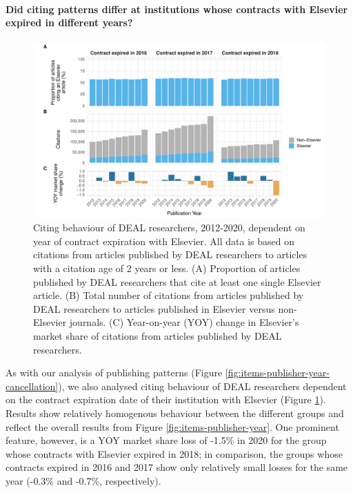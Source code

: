 \documentclass[
]{article}
\begin{document}
\hypertarget{did-citing-patterns-differ-at-institutions-whose-contracts-with-elsevier-expired-in-different-years}{%
\paragraph{Did citing patterns differ at institutions whose contracts with Elsevier expired in different years?}\label{did-citing-patterns-differ-at-institutions-whose-contracts-with-elsevier-expired-in-different-years}}

\begin{figure}

{\centering \includegraphics[width=0.833\linewidth]{analysis_files/figure-latex/references-publisher-year-cancellation-1} 

}

\caption{Citing behaviour of DEAL researchers, 2012-2020, dependent on year of contract expiration with Elsevier. All data is based on citations from articles published by DEAL researchers to articles with a citation age of 2 years or less. (A) Proportion of articles published by DEAL researchers that cite at least one single Elsevier article. (B) Total number of citations from articles published by DEAL researchers to articles published in Elsevier versus non-Elsevier journals. (C) Year-on-year (YOY) change in Elsevier's market share of citations from articles published by DEAL researchers.}\label{fig:references-publisher-year-cancellation}
\end{figure}

As with our analysis of publishing patterns (Figure \ref{fig:items-publisher-year-cancellation}), we also analysed citing behaviour of DEAL researchers dependent on the contract expiration date of their institution with Elsevier (Figure \ref{fig:references-publisher-year-cancellation}). Results show relatively homogenous behaviour between the different groups and reflect the overall results from Figure \ref{fig:items-publisher-year}. One prominent feature, however, is a YOY market share loss of -1.5\% in 2020 for the group whose contracts with Elsevier expired in 2018; in comparison, the groups whose contracts expired in 2016 and 2017 show only relatively small losses for the same year (-0.3\% and -0.7\%, respectively).
\end{document}
